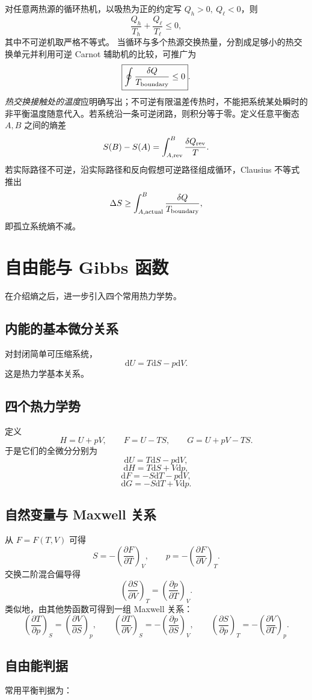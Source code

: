 \documentclass[11pt,a4paper,openany]{ctexbook}
\newcommand{\dd}{\mathrm d}
\newcommand{\pp}[2]{\frac{\partial #1}{\partial #2}}
\begin{document}
对任意两热源的循环热机，以吸热为正的约定写
$Q_h>0,\ Q_\ell<0$，则
\[
\frac{Q_h}{T_h}+\frac{Q_\ell}{T_\ell}\le0,
\]
其中不可逆机取严格不等式。
当循环与多个热源交换热量，分割成足够小的热交换单元并利用可逆 Carnot 辅助机的比较，可推广为
\[
\boxed{\oint\frac{\delta Q}{T_{\rm boundary}}\le0}.
\]
\emph{热交换接触处的温度}应明确写出；不可逆有限温差传热时，不能把系统某处瞬时的非平衡温度随意代入。若系统沿一条可逆闭路，则积分等于零。定义任意平衡态 $A,B$ 之间的熵差
\[
S(B)-S(A)=\int_{A,\rm rev}^{B}\frac{\delta Q_{\rm rev}}T.
\]
若实际路径不可逆，沿实际路径和反向假想可逆路径组成循环，Clausius 不等式推出
\[
\Delta S\ge \int_{A,\rm actual}^B
\frac{\delta Q}{T_{\rm boundary}},
\]
即孤立系统熵不减。



\section{自由能与 Gibbs 函数}
在介绍熵之后，进一步引入四个常用热力学势。

\subsection*{内能的基本微分关系}
对封闭简单可压缩系统，
\[
\boxed{\dd U=T\dd S-p\dd V}.
\]
这是热力学基本关系。

\subsection*{四个热力学势}
定义
\[
H=U+pV,\qquad
F=U-TS,\qquad
G=U+pV-TS.
\]
于是它们的全微分分别为
\[
\dd U=T\dd S-p\dd V,
\]
\[
\dd H=T\dd S+V\dd p,
\]
\[
\dd F=-S\dd T-p\dd V,
\]
\[
\dd G=-S\dd T+V\dd p.
\]

\subsection*{自然变量与 Maxwell 关系}
从 $F=F(T,V)$ 可得
\[
S=-\left(\pp FT\right)_V,
\qquad
p=-\left(\pp FV\right)_T.
\]
交换二阶混合偏导得
\[
\boxed{
\left(\pp SV\right)_T
=
\left(\pp pT\right)_V
}.
\]
类似地，由其他势函数可得到一组 Maxwell 关系：
\[
\left(\pp Tp\right)_S=\left(\pp VS\right)_p,\qquad
\left(\pp TV\right)_S=-\left(\pp pS\right)_V,\qquad
\left(\pp Sp\right)_T=-\left(\pp VT\right)_p.
\]

\subsection*{自由能判据}
常用平衡判据为：
\end{document}
